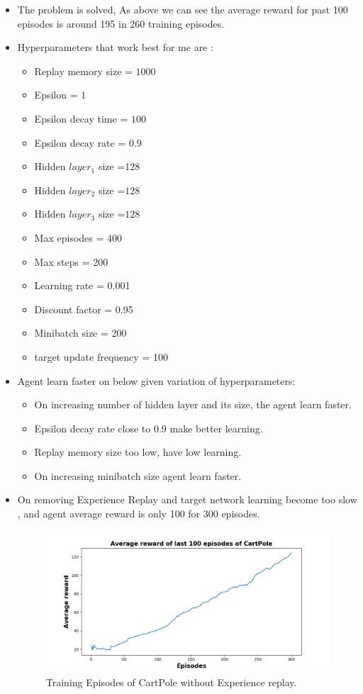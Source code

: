 \documentclass[a4paper]{article}
\begin{document}
\begin{itemize}
\item The problem is solved, As above we can see the average reward for past 100 episodes is around 195 in 260 training episodes.
\item Hyperparameters that work best for me are :  
\begin{itemize}
\item Replay memory size = $1000$
\item Epsilon = $1$
\item Epsilon decay time = $100$
\item Epsilon decay rate = $0.9$
\item Hidden $layer_1$ size =$128$
\item Hidden $layer_2$ size =$128$
\item Hidden $layer_3$ size =$128$
\item Max episodes = 400
\item Max steps = 200
\item Learning rate = 0.001
\item Discount factor = 0.95
\item Minibatch size = 200
\item target update frequency = 100
\end{itemize}
\item Agent learn faster on below given  variation of hyperparameters:
\begin{itemize}
\item On increasing number of hidden layer and its size, the agent learn faster.
\item Epsilon decay rate close to 0.9 make better learning.
\item Replay memory size too low, have low learning.
\item On increasing minibatch size agent learn faster. 
\end{itemize}

\item On removing Experience Replay and target network learning become too slow , and agent average reward is only 100 for 300 episodes.
\begin{figure}[htbp!]
\includegraphics[scale=0.6]{average_reward2.png}
\caption{Training Episodes of CartPole without Experience replay. }
\end{figure}
\end{itemize}

\newpage 
\end{document}
